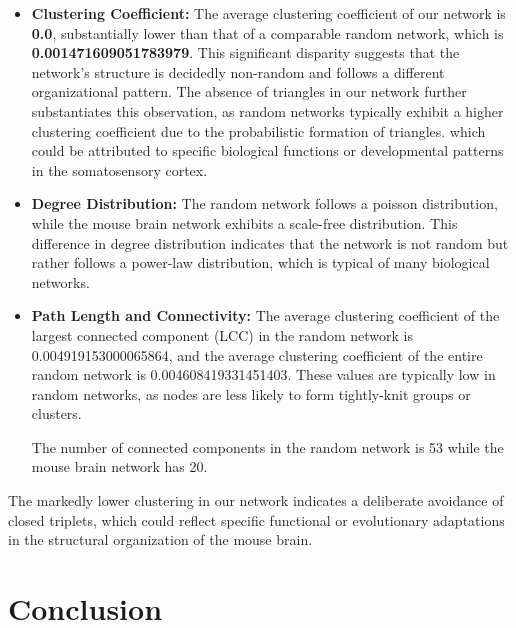\documentclass[
	report, %
	11pt, %
]{CSUniSchoolLabReport}
\begin{document}
	\begin{itemize}
		\item \textbf{Clustering Coefficient:} The average clustering coefficient of our network is \textbf{0.0}, substantially lower than that of a comparable random network, which is \textbf{\num{0.001471609051783979}}. This significant disparity suggests that the network's structure is decidedly non-random and follows a different organizational pattern. The absence of triangles in our network further substantiates this observation, as random networks typically exhibit a higher clustering coefficient due to the probabilistic formation of triangles. which could be attributed to specific biological functions or developmental patterns in the somatosensory cortex.
		\item \textbf{Degree Distribution:} The random network follows a poisson distribution, while the mouse brain network exhibits a scale-free distribution. This difference in degree distribution indicates that the network is not random but rather follows a power-law distribution, which is typical of many biological networks.
		\item \textbf{Path Length and Connectivity:} The average clustering coefficient of the largest connected component (LCC) in the random network is \num{0.004919153000065864}, and the average clustering coefficient of the entire random network is \num{0.004608419331451403}. These values are typically low in random networks, as nodes are less likely to form tightly-knit groups or clusters. 
		
		The number of connected components in the random network is 53 while the mouse brain network has 20.
		
	\end{itemize}
	\vspace{10pt}

	The markedly lower clustering in our network indicates a deliberate avoidance of closed triplets, which could reflect specific functional or evolutionary adaptations in the structural organization of the mouse brain.
	\pagebreak
	\section{Conclusion}
\end{document}
